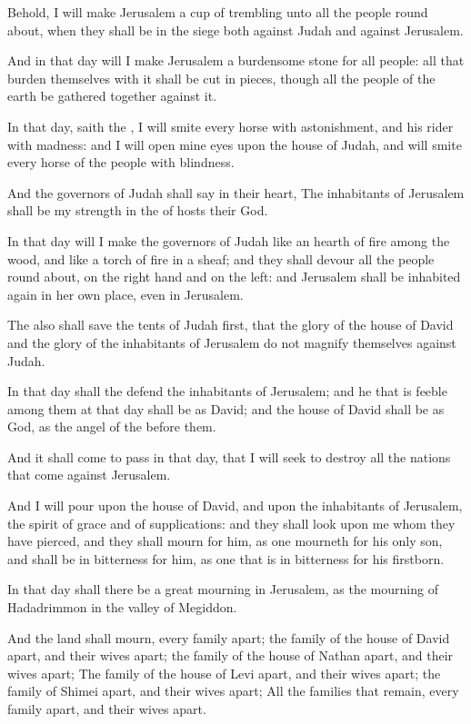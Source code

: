 \Verse Behold, I will make Jerusalem a cup of trembling unto all the people round about, when they shall be in the siege both against Judah and against Jerusalem.

\Verse And in that day will I make Jerusalem a burdensome stone for all people: all that burden themselves with it shall be cut in pieces, though all the people of the earth be gathered together against it.

\Verse In that day, saith the \LORD, I will smite every horse with astonishment, and his rider with madness: and I will open mine eyes upon the house of Judah, and will smite every horse of the people with blindness.

\Verse And the governors of Judah shall say in their heart, The inhabitants of Jerusalem shall be my strength in the \LORD of hosts their God.

\Verse In that day will I make the governors of Judah like an hearth of fire among the wood, and like a torch of fire in a sheaf; and they shall devour all the people round about, on the right hand and on the left: and Jerusalem shall be inhabited again in her own place, even in Jerusalem.

\Verse The \LORD also shall save the tents of Judah first, that the glory of the house of David and the glory of the inhabitants of Jerusalem do not magnify themselves against Judah.

\Verse In that day shall the \LORD defend the inhabitants of Jerusalem; and he that is feeble among them at that day shall be as David; and the house of David shall be as God, as the angel of the \LORD before them.

\Verse And it shall come to pass in that day, that I will seek to destroy all the nations that come against Jerusalem.

\Verse And I will pour upon the house of David, and upon the inhabitants of Jerusalem, the spirit of grace and of supplications: and they shall look upon me whom they have pierced, and they shall mourn for him, as one mourneth for his only son, and shall be in bitterness for him, as one that is in bitterness for his firstborn.

\Verse In that day shall there be a great mourning in Jerusalem, as the mourning of Hadadrimmon in the valley of Megiddon.

\Verse And the land shall mourn, every family apart; the family of the house of David apart, and their wives apart; the family of the house of Nathan apart, and their wives apart; \Verse The family of the house of Levi apart, and their wives apart; the family of Shimei apart, and their wives apart; \Verse All the families that remain, every family apart, and their wives apart.


